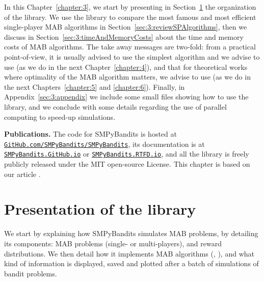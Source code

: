 In this Chapter~\ref{chapter:3}, we start by presenting in Section~\ref{sec:3:presentationLibrary} the organization of the library.
We use the library to compare the most famous and most efficient single-player MAB algorithms in Section~\ref{sec:3:reviewSPAlgorithms},
then we discuss in Section~\ref{sec:3:timeAndMemoryCosts} about the time and memory costs of MAB algorithms.
The take away messages are two-fold:
from a practical point-of-view, it is usually advised to use the simplest algorithm and we advise to use \UCB{} (as we do in the next Chapter~\ref{chapter:4}),
and that for theoretical works where optimality of the MAB algorithm matters, we advise to use \klUCB{} (as we do in the next Chapters~\ref{chapter:5} and \ref{chapter:6}).
%
Finally, in Appendix~\ref{sec:3:appendix} we include some small files showing how to use the library, and we conclude with some details regarding the use of parallel computing to speed-up simulations.


\textbf{Publications.}
%
The code for SMPyBandits is hosted at \texttt{\href{https://GitHub.com/SMPyBandits/SMPyBandits/}{GitHub.com/SMPyBandits/SMPyBandits}}, its documentation is at \texttt{\href{https://SMPyBandits.GitHub.io/}{SMPyBandits.GitHub.io}} or \texttt{\href{https://SMPyBandits.RTFD.io/}{SMPyBandits.RTFD.io}}, and all the library is freely publicly released under the MIT open-source License.
This chapter is based on our article \cite{SMPyBanditsJMLR}.


\section{Presentation of the library}
\label{sec:3:presentationLibrary}


We start by explaining how SMPyBandits simulates MAB problems, by detailing its components:
MAB problems (single- or multi-players),
and reward distributions.
%
We then detail how it implements MAB algorithms (\eg, \UCB),
and what kind of information is displayed, saved and plotted after a batch of simulations of bandit problems.


